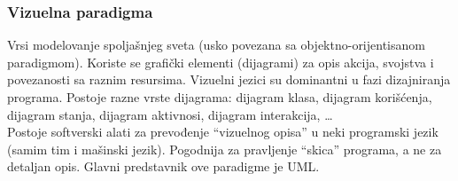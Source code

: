 \documentclass[../main.tex]{subfiles}
\begin{document}
\subsubsection{Vizuelna paradigma}												

Vrsi modelovanje spoljašnjeg sveta (usko povezana sa objektno-orijentisanom paradigmom). Koriste se grafički elementi (dijagrami) za opis akcija, svojstva i povezanosti sa raznim resursima. Vizuelni jezici su dominantni u fazi dizajniranja programa. Postoje razne vrste dijagrama: dijagram klasa, dijagram korišćenja, dijagram stanja, dijagram aktivnosi, dijagram interakcija, \ldots\\
Postoje softverski alati za prevođenje ``vizuelnog opisa'' u neki programski jezik (samim tim i mašinski jezik). Pogodnija za pravljenje ``skica'' programa, a ne za detaljan opis. Glavni predstavnik ove paradigme je UML.
\end{document}
